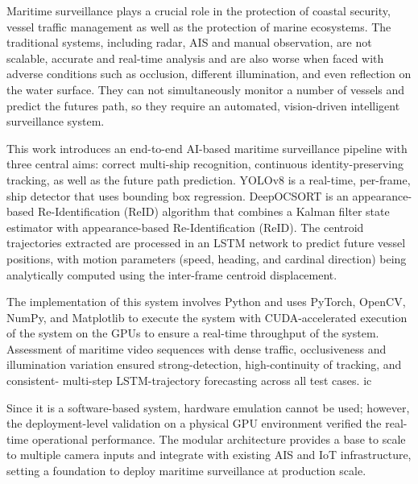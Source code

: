 \vspace{-1cm}


Maritime surveillance plays a crucial role in the protection of coastal security, vessel traffic management as well as the protection of marine ecosystems. The traditional systems, including radar, AIS and manual observation, are not scalable, accurate and real-time analysis and are also worse when faced with adverse conditions such as occlusion, different illumination, and even reflection on the water surface. They can not simultaneously monitor a number of vessels and predict the futures path, so they require an automated, vision-driven intelligent surveillance system.

This work introduces an end-to-end AI-based maritime surveillance pipeline with three central aims: correct multi-ship recognition, continuous identity-preserving tracking, as well as the future path prediction. YOLOv8 is a real-time, per-frame, ship detector that uses bounding box regression. DeepOCSORT is an appearance-based Re-Identification (ReID) algorithm that combines a Kalman filter state estimator with appearance-based Re-Identification (ReID). The centroid trajectories extracted are processed in an LSTM network to predict future vessel positions, with motion parameters (speed, heading, and cardinal direction) being analytically computed using the inter-frame centroid displacement.

The implementation of this system involves Python and uses PyTorch, OpenCV, NumPy, and Matplotlib to execute the system with CUDA-accelerated execution of the system on the GPUs to ensure a real-time throughput of the system. Assessment of maritime video sequences with dense traffic, occlusiveness and illumination variation ensured strong-detection, high-continuity of tracking, and consistent- multi-step LSTM-trajectory forecasting across all test cases.
\gls{ic}

Since it is a software-based system, hardware emulation cannot be used; however, the deployment-level validation on a physical GPU environment verified the real-time operational performance. The modular architecture provides a base to scale to multiple camera inputs and integrate with existing AIS and IoT infrastructure, setting a foundation to deploy maritime surveillance at production scale.
\pagebreak
